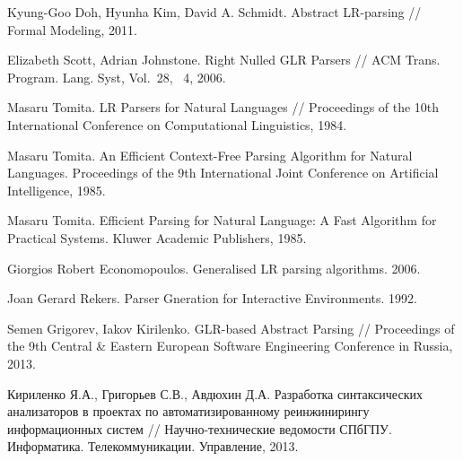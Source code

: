 \begin{thebibliography}{99}
 Kyung-Goo Doh, Hyunha Kim, David A. Schmidt.
 Abstract LR-parsing // Formal Modeling, 2011.

 Elizabeth Scott, Adrian Johnstone.
 Right Nulled GLR Parsers //
 ACM Trans. Program. Lang. Syst, Vol.~28, \textnumero~4, 2006.

 Masaru Tomita.
 LR Parsers for Natural Languages //
 Proceedings of the 10th International Conference on Computational Linguistics, 1984.

 Masaru Tomita.
 An Efficient Context-Free Parsing Algorithm for Natural Languages.
 Proceedings of the 9th International Joint Conference on Artificial Intelligence, 1985.

 Masaru Tomita.
 Efficient Parsing for Natural Language: A Fast Algorithm for Practical Systems. 
 Kluwer Academic Publishers, 1985.

  Giorgios Robert Economopoulos. 
  Generalised LR parsing algorithms. 2006.

  Joan Gerard Rekers.
  Parser Gneration for Interactive Environments. 1992.

  Semen Grigorev, Iakov Kirilenko.
  GLR-based Abstract Parsing // 
  Proceedings of the 9th Central \& Eastern European Software Engineering Conference in Russia, 2013.

 Кириленко Я.А., Григорьев С.В., Авдюхин Д.А.
 Разработка синтаксических анализаторов в проектах по автоматизированному реинжинирингу информационных систем //
 Научно-технические ведомости СПбГПУ. Информатика. Телекоммуникации. Управление, 2013.
\end{thebibliography}
